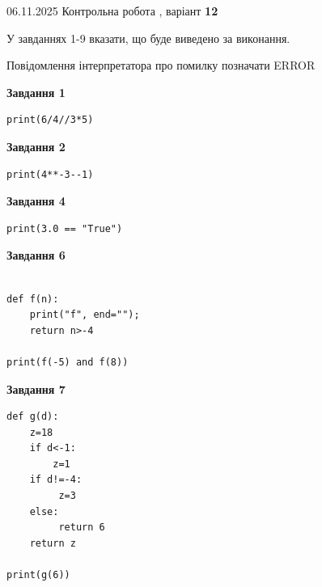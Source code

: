 \documentclass[12pt, ukrainian]{article}
\begin{document}
{\Large{06.11.2025 Контрольна робота , варіант  \No \textbf { 12 }\par}}
{
\begin {large}
У завданнях 1-9 вказати, що буде виведено за виконання.

Повідомлення інтерпретатора про помилку позначати ERROR

\begin{minipage}[t]{7.5cm}

\begin{center}
\textbf{Завдання 1}
\end{center}

\begin{verbatim}
print(6/4//3*5)
\end{verbatim}



\begin{center}
\textbf{Завдання 2}
\end{center}

\begin{verbatim}
print(4**-3--1)
\end{verbatim}



\begin{center}
\textbf{Завдання 4}
\end{center}

\begin{verbatim}
print(3.0 == "True")
\end{verbatim}



\begin{center}
\textbf{Завдання 6}
\end{center}

\begin{verbatim}

def f(n):
    print("f", end="");
    return n>-4

print(f(-5) and f(8))
\end{verbatim}



\begin{center}
\textbf{Завдання 7}
\end{center}

\begin{verbatim}
def g(d):
    z=18
    if d<-1: 
        z=1
    if d!=-4:
         z=3
    else:
         return 6
    return z

print(g(6))
\end{verbatim}


\end{minipage}
\end{large}}
\end{document}
